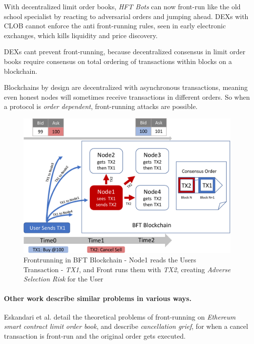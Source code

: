 \documentclass[12pt]{article}
\begin{document}
With decentralized limit order books, \emph{HFT Bots} can now front-run like the old school specialist by reacting to adversarial orders and jumping ahead. 
DEXs with CLOB cannot enforce the anti front-running rules, seen in early electronic exchanges, which kills liquidity and price discovery. 

DEXs cant prevent front-running, because decentralized consensus in limit order books require consensus on total ordering of transactions within blocks on a blockchain.

Blockchains by design are decentralized with asynchronous transactions, meaning even honest nodes will sometimes receive transactions in different orders. So when a protocol is \emph{order dependent}, front-running attacks are possible.

\begin{figure}[ht]
  \centering \includegraphics[scale=0.4]{frontrunning3-crop.pdf}
  \caption{Frontrunning in BFT Blockchain - Node1 reads the Users Transaction - \emph{TX1}, and Front runs them with \emph{TX2}, creating \emph{Adverse Selection Risk} for the User}\label{fig:front-running}
\end{figure}

\paragraph{Other work describe similar problems in various ways.} Eskandari et al. \cite{Eskandari} detail the theoretical problems of front-running on \emph{Ethereum} \emph{smart contract limit order book}, and describe \emph{cancellation grief}, for when a cancel transaction is front-run and the  original order gets executed. 
\end{document}
